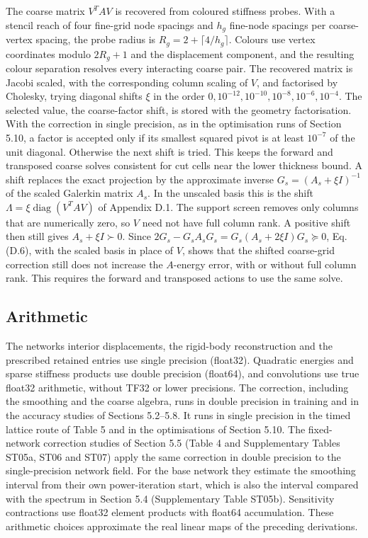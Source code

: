 \documentclass[preprint,12pt,authoryear]{elsarticle}
\begin{document}
The coarse matrix \(V^TAV\) is recovered from coloured stiffness probes. With a stencil reach of four fine-grid node spacings and \(h_g\) fine-node spacings per coarse-vertex spacing, the probe radius is \(R_g=2+\lceil4/h_g\rceil\). Colours use vertex coordinates modulo \(2R_g+1\) and the displacement component, and the resulting colour separation resolves every interacting coarse pair. The recovered matrix is Jacobi scaled, with the corresponding column scaling of \(V\), and factorised by Cholesky, trying diagonal shifts \(\xi\) in the order \(0,10^{-12},10^{-10},10^{-8},10^{-6},10^{-4}\). The selected value, the coarse-factor shift, is stored with the geometry factorisation. With the correction in single precision, as in the optimisation runs of Section 5.10, a factor is accepted only if its smallest squared pivot is at least \(10^{-7}\) of the unit diagonal. Otherwise the next shift is tried. This keeps the forward and transposed coarse solves consistent for cut cells near the lower thickness bound. A shift replaces the exact projection by the approximate inverse \(G_s=(A_s+\xi I)^{-1}\) of the scaled Galerkin matrix \(A_s\). In the unscaled basis this is the shift \(\Lambda=\xi\operatorname{diag}(V^TAV)\) of Appendix D.1. The support screen removes only columns that are numerically zero, so \(V\) need not have full column rank. A positive shift then still gives \(A_s+\xi I\succ0\). Since \(2G_s-G_sA_sG_s=G_s(A_s+2\xi I)G_s\succeq0\), Eq. (D.6), with the scaled basis in place of \(V\), shows that the shifted coarse-grid correction still does not increase the \(A\)-energy error, with or without full column rank. This requires the forward and transposed actions to use the same solve.

\subsection{Arithmetic}

The network\textquotesingle s interior displacements, the rigid-body reconstruction and the prescribed retained entries use single precision (float32). Quadratic energies and sparse stiffness products use double precision (float64), and convolutions use true float32 arithmetic, without TF32 or lower precisions. The correction, including the smoothing and the coarse algebra, runs in double precision in training and in the accuracy studies of Sections 5.2--5.8. It runs in single precision in the timed lattice route of Table 5 and in the optimisations of Section 5.10. The fixed-network correction studies of Section 5.5 (Table 4 and Supplementary Tables ST05a, ST06 and ST07) apply the same correction in double precision to the single-precision network field. For the base network they estimate the smoothing interval from their own power-iteration start, which is also the interval compared with the spectrum in Section 5.4 (Supplementary Table ST05b). Sensitivity contractions use float32 element products with float64 accumulation. These arithmetic choices approximate the real linear maps of the preceding derivations.
\end{document}
